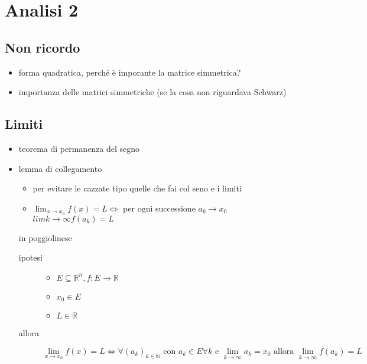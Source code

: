 \documentclass[11pt]{article}
\author{Biggus Diccus}
\date{\today}
\title{}
\begin{document}
\tableofcontents

\section{Analisi 2}
\label{sec:orga13deeb}
\subsection{Non ricordo}
\label{sec:orgb940c26}
\begin{itemize}
\item forma quadratica, perché è imporante la matrice simmetrica?
\item importanza delle matrici simmetriche (se la cosa non riguardava Schwarz)
\end{itemize}

\subsection{Limiti}
\label{sec:org343cbde}
\begin{itemize}
\item teorema di permanenza del segno
\item lemma di collegamento
\begin{itemize}
\item per evitare le cazzate tipo quelle che fai col seno e i limiti
\item \(\lim_{x \to x_0} f(x) = L \iff\) per ogni
successione \(a_k \to x_0\) \(lim{k \to \infty} f(a_k) = L\)
\end{itemize}
in poggiolinese
\begin{description}
\item[{ipotesi}] \begin{itemize}
\item \(E \subseteq \mathbb{R}^n, f : E \to \mathbb{R}\)
\item \(x_0 \in E\)
\item \(L \in \mathbb{R}\)
\end{itemize}
\item[{allora}] \[
     \lim_{x \to x_0} f(x) = L \iff
     \forall (a_k)_{k \in \mathbb{N}}
     \text{ con } a_k \in E \forall k \text{ e }
     \lim_{k \to \infty} a_k = x_0 \text{ allora }
     \lim_{k \to \infty} f(a_k) = L
     \]
\end{description}
\end{itemize}
\end{document}
